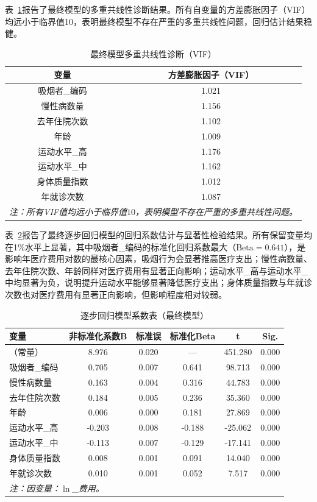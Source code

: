 \documentclass[a4paper]{ctexart}
\begin{document}
表~\ref{tab:vif}报告了最终模型的多重共线性诊断结果。所有自变量的方差膨胀因子（VIF）均远小于临界值10，表明最终模型不存在严重的多重共线性问题，回归估计结果稳健。

\begin{table}[H]
\centering
\caption{最终模型多重共线性诊断（VIF）}
\label{tab:vif}
\begin{tabular}{c c}
\toprule
变量 & 方差膨胀因子（VIF） \\
\midrule
吸烟者\_编码 & 1.021 \\
慢性病数量 & 1.156 \\
去年住院次数 & 1.102 \\
年龄 & 1.009 \\
运动水平\_高 & 1.176 \\
运动水平\_中 & 1.162 \\
身体质量指数 & 1.012 \\
年就诊次数 & 1.087 \\
\bottomrule
\multicolumn{2}{l}{\textit{注：所有VIF值均远小于临界值$10$，表明模型不存在严重的多重共线性问题。}}
\end{tabular}
\end{table}

表~\ref{tab:coef2}报告了最终逐步回归模型的回归系数估计与显著性检验结果。所有保留变量均在1\%水平上显著，其中吸烟者\_编码的标准化回归系数最大（\(\text{Beta}=0.641\)），是影响年医疗费用对数的最核心因素，吸烟行为会显著推高医疗支出；慢性病数量、去年住院次数、年龄同样对医疗费用有显著正向影响；运动水平\_高与运动水平\_中均显著为负，说明提升运动水平能够显著降低医疗支出；身体质量指数与年就诊次数也对医疗费用有显著正向影响，但影响程度相对较弱。

\begin{table}[H]
\centering
\caption{逐步回归模型系数表（最终模型）}
\label{tab:coef2}
\begin{tabular}{l c c c c c}
\toprule
变量 & 非标准化系数B & 标准误 & 标准化Beta & t & Sig. \\
\midrule
（常量） & 8.976 & 0.020 & — & 451.280 & 0.000 \\
吸烟者\_编码 & 0.705 & 0.007 & 0.641 & 98.713 & 0.000 \\
慢性病数量 & 0.163 & 0.004 & 0.316 & 44.783 & 0.000 \\
去年住院次数 & 0.184 & 0.005 & 0.236 & 35.360 & 0.000 \\
年龄 & 0.006 & 0.000 & 0.181 & 27.869 & 0.000 \\
运动水平\_高 & -0.203 & 0.008 & -0.188 & -25.062 & 0.000 \\
运动水平\_中 & -0.113 & 0.007 & -0.129 & -17.141 & 0.000 \\
身体质量指数 & 0.008 & 0.001 & 0.091 & 14.040 & 0.000 \\
年就诊次数 & 0.010 & 0.001 & 0.052 & 7.517 & 0.000 \\
\bottomrule
\multicolumn{6}{l}{\textit{注：因变量：\(\ln\)\_费用。}}
\end{tabular}
\end{table}
\end{document}
